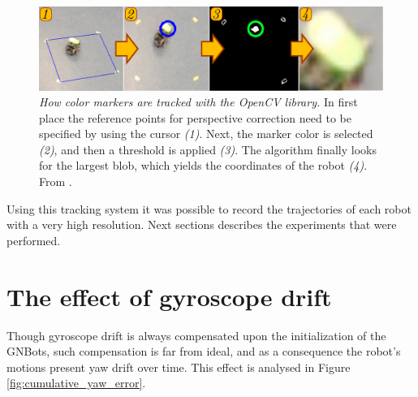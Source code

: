 \documentclass[12pt,twoside]{report}
\begin{document}
\begin{figure}[hbtp]
\centerline{\includegraphics[width=0.9\linewidth]{opencv_tracking_steps}}
\caption[How color markers are tracked with the OpenCV library]{\emph{How color markers are tracked with the OpenCV library.}
In first place the reference points for perspective correction need to be specified by using the cursor \emph{(1)}. Next, the marker color is selected \emph{(2)}, and then a threshold is applied \emph{(3)}. The algorithm finally looks for the largest blob, which yields the coordinates of the robot \emph{(4)}. From \cite{GarciaSaura14}.
}
\label{fig:opencv_tracking_steps}
\end{figure}


Using this tracking system it was possible to record the trajectories of each robot with a very high resolution. Next sections describes the experiments that were performed.

\vspace{-5mm}

\section{The effect of gyroscope drift} \label{sec:sect31}

\vspace{-5mm}

Though gyroscope drift is always compensated upon the initialization of the GNBots, such compensation is far from ideal, and as a consequence the robot's motions present yaw drift over time. This effect is analysed in Figure \ref{fig:cumulative_yaw_error}.
\end{document}
